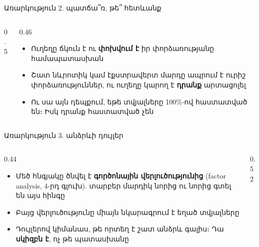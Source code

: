 \begin{frame}{Առարկություն 2. պատճա՞ռ, թե՞ հետևանք}
  \begin{columns}[c]
    \begin{column}{0.5\textwidth}
      \centering
    \end{column}
    \begin{column}{0.46\textwidth}
      \begin{itemize}
        \item Ուղեղը ճկուն է ու \textbf{փոխվում է} իր փորձառությանը համապատասխան
        \item<2-> Շատ նևրոտիկ կամ էքստրավերտ մարդը ապրում է ուրիշ փորձառություններ, ու ուղեղը կարող է \textbf{դրանք} արտացոլել
        \item<3-> Ու սա այն դեպքում, եթե տվյալները 100\%-ով հաստատված են։ Իսկ դրանք հաստատված չեն
      \end{itemize}
    \end{column}
  \end{columns}
\end{frame}

\begin{frame}{Առարկություն 3. անձրևի դույլեր}
  \begin{columns}[c]
    \begin{column}{0.44\textwidth}
      \begin{itemize}
        \item Մեծ հնգյակը ծնվել է \textbf{գործոնային վերլուծությունից} (factor analysis, 4-րդ գլուխ). տարբեր մարդիկ նորից ու նորից գտել են այս հինգը
        \item<2-> Բայց վերլուծությունը միայն նկարագրում է եղած տվյալները
        \item<2-> Դույլերով կիմանաս, թե որտեղ է շատ անձրև գալիս։ Դա \textbf{սկիզբն է}, ոչ թե պատասխանը
      \end{itemize}
    \end{column}
    \begin{column}{0.52\textwidth}
      \centering
      \scalebox{0.9}{}
    \end{column}
  \end{columns}
\end{frame}

